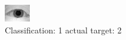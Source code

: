 \begin{figure}[h!]
\begin{center}
\includegraphics[width=0.60\columnwidth]{figures/ID996_class_1_target_2.png}
\end{center}
\caption{ Classification: 1 actual target: 2}
\label{fig:ID996_class_1_target_2}
\end{figure}
